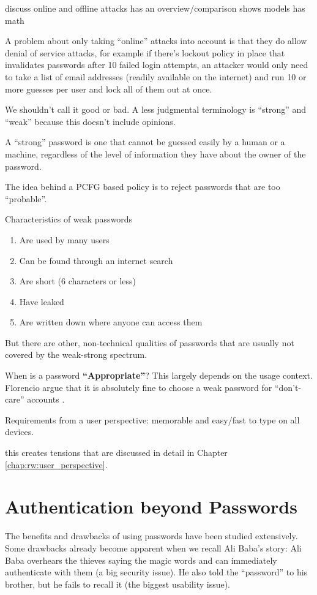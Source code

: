 discuss online and offline attacks
\cite{Wang2016fuzzyPWM} has an overview/comparison
\cite{Florencio2014AdministratorsGuide} shows models
\cite{Florencio2014PasswordPortfoliosFiniteUser} has math

A problem about only taking ``online'' attacks into account is that they do allow denial of service attacks, for example if there's lockout policy in place that invalidates passwords after 10 failed login attempts, an attacker would only need to take a list of email addresses (readily available on the internet) and run 10 or more guesses per user and lock all of them out at once. 



We shouldn't call it good or bad. A less judgmental terminology is ``strong'' and ``weak'' because this doesn't include opinions. 

A ``strong'' password is one that cannot be guessed easily by a human or a machine, regardless of the level of information they have about the owner of the password. 


The idea behind a PCFG based policy is to reject passwords that are too ``probable''. 

Characteristics of weak passwords \cite{Burnett2005PerfectPasswords}
\begin{enumerate}
	\item Are used by many users
	\item Can be found through an internet search
	\item Are short (6 characters or less)
	\item Have leaked
	\item Are written down where anyone can access them
\end{enumerate}

But there are other, non-technical qualities of passwords that are usually not covered by the weak-strong spectrum. 

When is a password \textbf{``Appropriate''}? This largely depends on the usage context. \cite{Gaw2005ReuseRecycle, Haque2014Hierarchy}
Florencio \etal argue that it is absolutely fine to choose a weak password for ``don't-care'' accounts \cite{Florencio2014}.

Requirements from a user perspective: memorable and easy/fast to type on all devices.

this creates tensions that are discussed in detail in Chapter \ref{chap:rw:user_perspective}.


\section{Authentication beyond Passwords}\label{sec:rw:authentication_without_pws}
The benefits and drawbacks of using passwords have been studied extensively. Some drawbacks already become apparent when we recall Ali Baba's story: Ali Baba overhears the thieves saying the magic words and can immediately authenticate with them (a big security issue). He also told the ``password'' to his brother, but he fails to recall it (the biggest usability issue).

